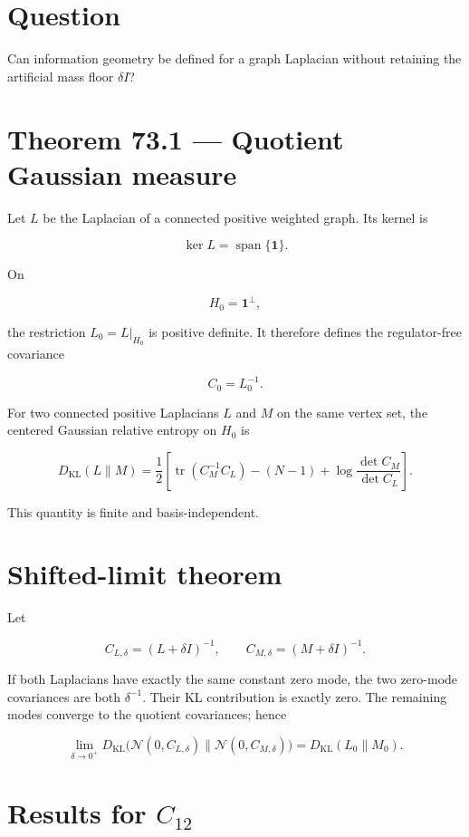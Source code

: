 \documentclass[11pt,a4paper,openany]{report}
\begin{document}
\section{Question}

Can information geometry be defined for a graph Laplacian without retaining the artificial mass floor \(\delta I\)?

\section{Theorem 73.1 --- Quotient Gaussian measure}

Let \(L\) be the Laplacian of a connected positive weighted graph. Its kernel is

\[
\ker L=\operatorname{span}\{\mathbf1\}.
\]

On

\[
H_0=\mathbf1^\perp,
\]

the restriction \(L_0=L|_{H_0}\) is positive definite. It therefore defines the regulator-free covariance

\[
C_0=L_0^{-1}.
\]

For two connected positive Laplacians \(L\) and \(M\) on the same vertex set, the centered Gaussian relative entropy on \(H_0\) is

\[
D_{\mathrm{KL}}(L\|M)
=
\frac12
\left[
\operatorname{tr}(C_M^{-1}C_L)
-(N-1)
+\log\frac{\det C_M}{\det C_L}
\right].
\]

This quantity is finite and basis-independent.

\section{Shifted-limit theorem}

Let

\[
C_{L,\delta}=(L+\delta I)^{-1},
\qquad
C_{M,\delta}=(M+\delta I)^{-1}.
\]

If both Laplacians have exactly the same constant zero mode, the two zero-mode covariances are both \(\delta^{-1}\). Their KL contribution is exactly zero. The remaining modes converge to the quotient covariances; hence

\[
\lim_{\delta\to0^+}
D_{\mathrm{KL}}
\bigl(
\mathcal N(0,C_{L,\delta})
\|
\mathcal N(0,C_{M,\delta})
\bigr)
=
D_{\mathrm{KL}}(L_0\|M_0).
\]

\section{\texorpdfstring{Results for \(C_{12}\)}{Results for C\_12}}
\end{document}
